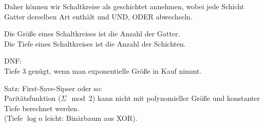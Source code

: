 Daher können wir Schaltkreise als geschichtet annehmen, wobei jede Schicht
Gatter derselben Art enthält und UND, ODER abwechseln.

Die Größe eines Schaltkreises ist die Anzahl der Gatter.
\\
Die Tiefe eines Schaltkreises ist die Anzahl der Schichten.


DNF:\\
Tiefe 3 genügt, wenn man exponentielle Größe in Kauf nimmt.


Satz: First-Save-Sipser oder so:\\
Paritätsfunktion ($\Sigma \mod 2$) kann nicht mit polynomieller Größe und
konstanter Tiefe berechnet werden.
\\
(Tiefe $\log n$ leicht: Binärbaum aus XOR).

















